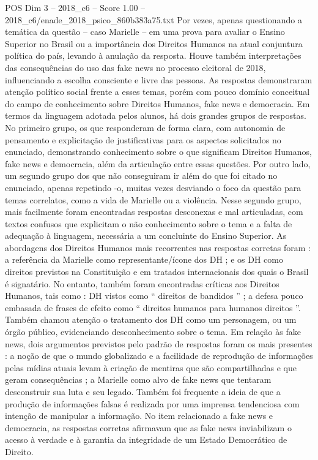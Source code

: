 \begin{textsample}{POS Dim 3 – 2018\_c6 – Score 1.00 – 2018\_c6/enade\_2018\_psico\_860b383a75.txt}
Por vezes, apenas questionando a temática da questão – caso Marielle – em uma prova para avaliar o Ensino Superior no Brasil ou a importância dos Direitos Humanos na atual conjuntura política do país, levando à anulação da resposta.
Houve também interpretações das consequências do uso das fake news no processo eleitoral de 2018, influenciando a escolha consciente e livre das pessoas.
As respostas demonstraram atenção político social frente a esses temas, porém com pouco domínio conceitual do campo de conhecimento sobre Direitos Humanos, fake news e democracia.
Em termos da linguagem adotada pelos alunos, há dois grandes grupos de respostas.
No primeiro grupo, os que responderam de forma clara, com autonomia de pensamento e explicitação de justificativas para os aspectos solicitados no enunciado, demonstrando conhecimento sobre o que significam Direitos Humanos, fake news e democracia, além da articulação entre essas questões.
Por outro lado, um segundo grupo dos que não conseguiram ir além do que foi citado no enunciado, apenas repetindo -o, muitas vezes desviando o foco da questão para temas correlatos, como a vida de Marielle ou a violência.
Nesse segundo grupo, mais facilmente foram encontradas respostas desconexas e mal articuladas, com textos confusos que explicitam o não conhecimento sobre o tema e a falta de adequação à linguagem, necessária a um concluinte do Ensino Superior.
As abordagens dos Direitos Humanos mais recorrentes nas respostas corretas foram : a referência da Marielle como representante/ícone dos DH ; e os DH como direitos previstos na Constituição e em tratados internacionais dos quais o Brasil é signatário.
No entanto, também foram encontradas críticas aos Direitos Humanos, tais como : DH vistos como “ direitos de bandidos ” ; a defesa pouco embasada de frases de efeito como “ direitos humanos para humanos direitos ”.
Também chamou atenção o tratamento dos DH como um personagem, ou um órgão público, evidenciando desconhecimento sobre o tema.
Em relação às fake news, dois argumentos previstos pelo padrão de respostas foram os mais presentes : a noção de que o mundo globalizado e a facilidade de reprodução de informações pelas mídias atuais levam à criação de mentiras que são compartilhadas e que geram consequências ; a Marielle como alvo de fake news que tentaram desconstruir sua luta e seu legado.
Também foi frequente a ideia de que a produção de informações falsas é realizada por uma imprensa tendenciosa com intenção de manipular a informação.
No item relacionado a fake news e democracia, as respostas corretas afirmavam que as fake news inviabilizam o acesso à verdade e à garantia da integridade de um Estado Democrático de Direito.

\end{textsample}

